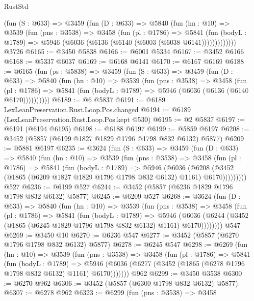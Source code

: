 \begin{lexlean}{RustStd}
\begin{coremodule}
        (fun (S : @633) =>
        @3459
          (fun (D : @633) =>
          @5840
            (fun (hn : @10) =>
            @3539
              (fun (pns : @3538) =>
              @3458
                (fun (pl : @1786) =>
                @5841
                  (fun (bodyL : @1789) =>
                  @5946 (@6036 (@6136 (@6140 (@6003 (@6038 @6141)))))))))))))
    @3726
@6165 := @3450 @5838
@6166 := @6001 @5334
@6167 := @3452 @6166
@6168 := @5337 @6037
@6169 := @6168 @6141
@6170 := @6167 @6169
@6188 := @6165
    (fun (ps : @5838) =>
    @3459
      (fun (S : @633) =>
      @3459
        (fun (D : @633) =>
        @5840
          (fun (hn : @10) =>
          @3539
            (fun (pns : @3538) =>
            @3458
              (fun (pl : @1786) =>
              @5841 (fun (bodyL : @1789) => @5946 (@6036 (@6136 (@6140 @6170))))))))))
@6189 := @6 @5837
@6191 := @6189 LexLeanPreservation.Rust.Loop.Pos.changed
@6194 := @6189 (LexLeanPreservation.Rust.Loop.Pos.kept @530)
@6195 := @2 @5837
@6197 := @6191 (@6194 @6195)
@6198 := @6188 @6197
@6199 := @5859 @6197
@6208 := @3452 (@5857 (@6199 @1827 @1829 @1796 @1798 @832 @6132) @5877)
@6209 := @5881 @6197
@6235 := @3624
    (fun (S : @633) =>
    @3459
      (fun (D : @633) =>
      @5840
        (fun (hn : @10) =>
        @3539
          (fun (pns : @3538) =>
          @3458
            (fun (pl : @1786) =>
            @5841
              (fun (bodyL : @1789) =>
              @5946
                (@6036
                  (@6208
                    (@3452 (@1865 (@6209 @1827 @1829 @1796 @1798 @832 @6132) @1161) @6170)))))))))
    @527
@6236 := @6199 @527
@6244 := @3452 (@5857 (@6236 @1829 @1796 @1798 @832 @6132) @5877)
@6245 := @6209 @527
@6268 := @3624
    (fun (D : @633) =>
    @5840
      (fun (hn : @10) =>
      @3539
        (fun (pns : @3538) =>
        @3458
          (fun (pl : @1786) =>
          @5841
            (fun (bodyL : @1789) =>
            @5946
              (@6036 (@6244 (@3452 (@1865 (@6245 @1829 @1796 @1798 @832 @6132) @1161) @6170))))))))
    @547
@6269 := @3450 @10
@6270 := @6236 @547
@6277 := @3452 (@5857 (@6270 @1796 @1798 @832 @6132) @5877)
@6278 := @6245 @547
@6298 := @6269
    (fun (hn : @10) =>
    @3539
      (fun (pns : @3538) =>
      @3458
        (fun (pl : @1786) =>
        @5841
          (fun (bodyL : @1789) =>
          @5946 (@6036 (@6277 (@3452 (@1865 (@6278 @1796 @1798 @832 @6132) @1161) @6170)))))))
    @962
@6299 := @3450 @3538
@6300 := @6270 @962
@6306 := @3452 (@5857 (@6300 @1798 @832 @6132) @5877)
@6307 := @6278 @962
@6323 := @6299
    (fun (pns : @3538) =>
    @3458

\end{coremodule}
\end{lexlean}
